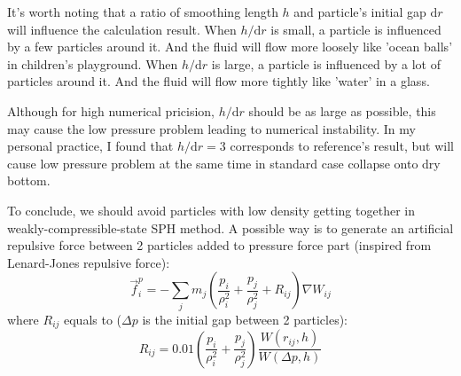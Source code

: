 \begin{figure}[H]
    \centering
\end{figure}

It's worth noting that a ratio of smoothing length $h$ and particle's initial gap $\mathrm{d}r$ 
will influence the calculation result.
When $h/\mathrm{d}r$ is small, 
a particle is influenced by a few particles around it.
And the fluid will flow more loosely like 'ocean balls' in children's playground.
When $h/\mathrm{d}r$ is large, 
a particle is influenced by a lot of particles around it.
And the fluid will flow more tightly like 'water' in a glass.

Although for high numerical pricision, 
$h/\mathrm{d}r$ should be as large as possible, 
this may cause the low pressure problem leading to numerical instability.
In my personal practice,
I found that $h/\mathrm{d}r=3$ corresponds to reference's result, 
but will cause low pressure problem at the same time in standard case collapse onto dry bottom.

To conclude, 
we should avoid particles with low density getting together in weakly-compressible-state SPH method.
A possible way is to generate an artificial repulsive force between 2 particles 
added to pressure force part (inspired from Lenard-Jones repulsive force):
\begin{equation}
    \vec{f}_i^p = 
    -\sum_j 
    m_j 
    \left(
        \frac{p_i}{\rho_i^2} + \frac{p_j}{\rho_j^2} + R_{ij}
    \right)\nabla W_{ij}
\end{equation}
where $R_{ij}$ equals to ($\Delta p$ is the initial gap between 2 particles):
\begin{equation}
    R_{ij} = 
    0.01
    \left(
        \frac{p_i}{\rho_i^2} + \frac{p_j}{\rho_j^2}
    \right)
    \frac{W(r_{ij}, h)}{W(\Delta p, h)}
\end{equation}

